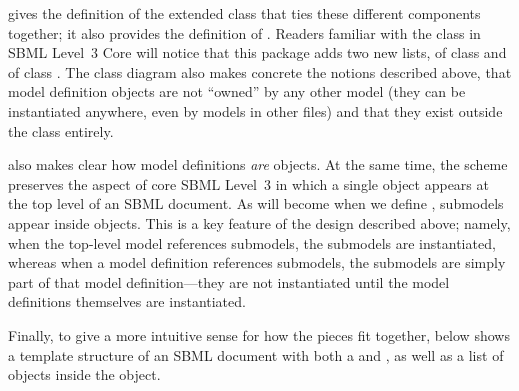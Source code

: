  gives the definition of the extended
\SBML class that ties these different components together; it also
provides the definition of \ExternalModelDefinition.  Readers familiar
with the \SBML class in SBML Level~3 Core will notice that this package
adds two new lists,  of class 
\ListOfModelDefinitions and  
of class \ListOfExternalModelDefinitions.  The class diagram
also makes concrete the notions described above, that model definition
objects are not ``owned'' by any other model (they can be instantiated
anywhere, even by models in other files) and that they exist outside the
\Model class entirely.

 also makes clear how model definitions
\emph{are} \Model objects.  At the same time, the scheme preserves the
aspect of core SBML Level~3 in which a single \Model object appears at
the top level of an SBML document.  As will become when we define
\Model, submodels appear inside \Model objects.  This is a key feature
of the design described above; namely, when the top-level model
references submodels, the submodels are instantiated, whereas when a
model definition references submodels, the submodels are simply part of
that model definition---they are not instantiated until the model
definitions themselves are instantiated.

Finally, to give a more intuitive sense for how the pieces fit together,
 below shows a template structure of an SBML document
with both a  and
, as well as a list of \Submodel
objects inside the \Model object.

\newcommand{\sayOptional}{\raisebox{0pt}[0pt][0pt]{\bigg\} \textrm{\emph{optional}}}}

